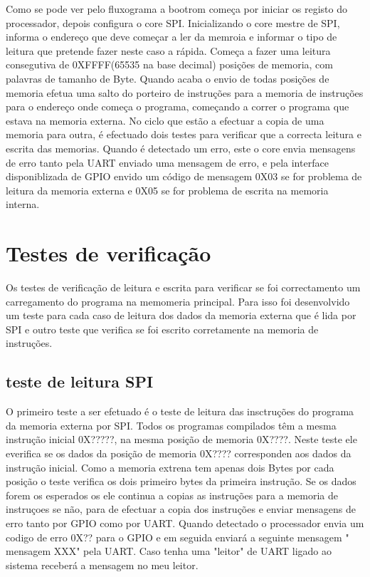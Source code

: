 Como se pode ver pelo fluxograma a bootrom começa por iniciar os registo do processador, depois configura o core SPI. Inicializando o core mestre de SPI, informa o endereço que deve começar a ler da memroia e informar o tipo de leitura que pretende fazer neste caso a rápida. Começa a fazer uma leitura consegutiva de 0XFFFF(65535 na base decimal) posições de memoria, com palavras de tamanho de Byte. Quando acaba o envio de todas posições de memoria efetua uma salto do porteiro de instruções para a memoria de instruções para o endereço onde começa o programa, começando a correr o programa que estava na memoria externa. No ciclo que estão a efectuar a copia de uma memoria para outra, é efectuado dois testes para verificar que a correcta leitura e escrita das memorias. Quando é detectado um erro, este o core envia mensagens de erro tanto pela UART enviado uma mensagem de erro, e pela interface disponiblizada de GPIO envido um código de mensagem 0X03 se for problema de leitura da memoria externa e 0X05 se for problema de escrita na memoria interna.

\section{Testes de verifica\c{c}\~ao}
Os testes de verificação de leitura e escrita para verificar se foi correctamento um carregamento do programa na memomeria principal. Para isso foi desenvolvido um teste para cada caso de leitura dos dados da memoria externa que é lida por SPI e outro teste que verifica se foi escrito corretamente na memoria de instruções. 

\subsection{teste de leitura SPI}

O primeiro teste a ser efetuado é o teste de leitura das insctruções do programa da memoria externa por SPI. Todos os programas compilados têm a mesma instrução inicial 0X?????, na mesma posição de memoria 0X????. Neste teste ele everifica se os dados da posição de memoria 0X???? corresponden aos dados da instrução inicial. Como a memoria extrena tem apenas dois Bytes por cada posição o teste verifica os dois primeiro bytes da primeira instrução. Se os dados forem os esperados os ele continua a copias as instruções para a memoria de instruçoes se não, para de efectuar a copia dos instruções e enviar mensagens de erro tanto por GPIO como por UART. Quando detectado o processador envia um codigo de erro 0X?? para o GPIO e em seguida enviará a seguinte mensagem " mensagem XXX" pela UART. Caso tenha uma "leitor" de UART ligado ao sistema receberá a mensagem no meu leitor.

